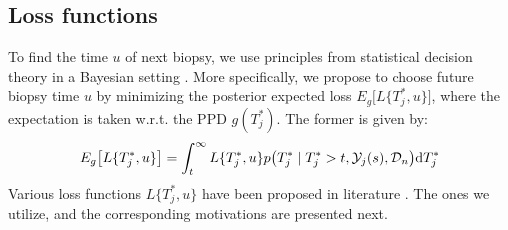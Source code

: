 
\subsection{Loss functions}
\label{subsec : loss_functions}
To find the time $u$ of next biopsy, we use principles from statistical decision theory in a Bayesian setting \citep{bergerDecisionTheory,robertBayesianChoice}. More specifically, we propose to choose future biopsy time $u$ by minimizing the posterior expected loss $E_g\big[L\{T^*_j, u\}\big]$, where the expectation is taken w.r.t. the PPD $g(T^*_j)$. The former is given by:
\begin{equation*}
E_g\big[L\{T^*_j, u\}\big] = \int_t^\infty L\{T^*_j, u\} p\big(T^*_j \mid T^*_j > t, \mathcal{Y}_j(s), \mathcal{D}_n\big) \mathrm{d} T^*_j
\end{equation*}
Various loss functions $L\{T^*_j, u\}$ have been proposed in literature \citep{robertBayesianChoice}. The ones we utilize, and the corresponding motivations are presented next.

